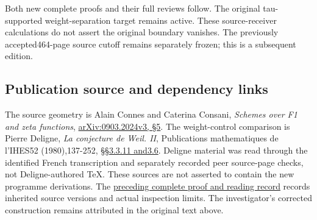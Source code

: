 Both new complete proofs and their full reviews follow. The original
tau-supported weight-separation target remains active. These
source-receiver calculations do not assert the original boundary
vanishes. The previously accepted464-page source cutoff remains
separately frozen; this is a subsequent edition.

\subsection{Publication source and dependency
links}\label{publication-source-and-dependency-links}

The source geometry is Alain Connes and Caterina Consani, \emph{Schemes
over F1 and zeta functions},
\href{https://arxiv.org/abs/0903.2024v3}{arXiv:0903.2024v3, §5}. The
weight-control comparison is Pierre Deligne, \emph{La conjecture de
Weil. II}, Publications mathematiques de l'IHES52 (1980),137-252,
\href{https://www.numdam.org/item/PMIHES_1980__52__137_0/}{§§3.3.11
and3.6}. Deligne material was read through the identified French
transcription and separately recorded peer source-page checks, not
Deligne-authored TeX. These sources are not asserted to contain the new
programme derivations. The
\href{https://github.com/KokunoYumeto/zeta-function-research-reader/blob/36a82ecca98addb8a98b48204e349737856c7223/workbenches/splitzero-tandem/continuations/20260924-cohomology-weight-and-character-lifts/BUILD_AND_REVIEW.md}{preceding
complete proof and reading record} records inherited source versions and
actual inspection limits. The investigator's corrected construction
remains attributed in the original text above.
